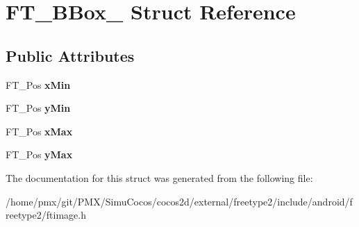 \hypertarget{structFT__BBox__}{}\section{F\+T\+\_\+\+B\+Box\+\_\+ Struct Reference}
\label{structFT__BBox__}
\subsection*{Public Attributes}
\begin{DoxyCompactItemize}
\item 
\mbox{\label{structFT__BBox___a1f2a5d0565d496c1d41e43d018f45add}} 
F\+T\+\_\+\+Pos {\bfseries x\+Min}
\item 
\mbox{\label{structFT__BBox___a959ca1d5bc1c5338da0d85c8e7135f4e}} 
F\+T\+\_\+\+Pos {\bfseries y\+Min}
\item 
\mbox{\label{structFT__BBox___ac6da5c44f4cb7b97eef1f438eb69c0ec}} 
F\+T\+\_\+\+Pos {\bfseries x\+Max}
\item 
\mbox{\label{structFT__BBox___a77084921589f386a8a593ae1f25b1569}} 
F\+T\+\_\+\+Pos {\bfseries y\+Max}
\end{DoxyCompactItemize}


The documentation for this struct was generated from the following file\+:\begin{DoxyCompactItemize}
\item 
/home/pmx/git/\+P\+M\+X/\+Simu\+Cocos/cocos2d/external/freetype2/include/android/freetype2/ftimage.\+h\end{DoxyCompactItemize}
